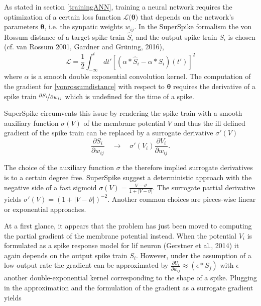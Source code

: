 As stated in section \ref{trainingANN}, training a neural network requires the optimization of a certain loss function $\mathcal{L(\mathbf{\theta)}}$ that depends on the network's parameters $\mathbf{\theta}$, i.e. the synpatic weights $w_{ij}$. In the SuperSpike formalism the von Rossum distance of a target spike train $\hat{S}_i$ and the output spike train $S_i$ is chosen (cf. van Rossum 2001, Gardner and Grüning, 2016),
\begin{equation}
\label{vonrossumdistance}
\mathcal{L} = \frac{1}{2} \int^t_{-\infty}dt' \left[\left(\alpha \ast \hat{S}_i - \alpha \ast S_i \right)(t')\right]^2
\end{equation}
where $\alpha$ is a smooth double exponential convolution kernel. The computation of the gradient for \ref{vonrossumdistance} with respect to $\mathbf{\theta}$ requires the derivative of a spike train $\nicefrac{\partial{S_i}}{\partial{w_{ij}}}$ which is undefined for the time of a spike. 

SuperSpike circumvents this issue by rendering the spike train with a smooth auxiliary function $\sigma(V)$ of the membrane potential $V$ and thus the ill defined gradient of the spike train can be replaced by a surrogate derivative $\sigma'(V)$
\begin{equation}
\frac{\partial S_i}{\partial w_{ij}} \quad \rightarrow \quad \sigma'(V_i)\frac{\partial V_i}{\partial w_{ij}}.
\end{equation}

The choice of the auxiliary function $\sigma$ the therefore implied surrogate derivatives is to a certain degree free. SuperSpike suggest a deterministic approach with the negative side of a fast sigmoid $\sigma(V) = \frac{V - \vartheta}{1 + |V - \vartheta|}$. The surrogate partial derivative yields $\sigma'(V) = \left(1 + |V - \vartheta|\right)^{-2}$. Another common choices are pieces-wise linear or exponential approaches.

At a first glance, it appears that the problem has just been moved to computing the partial gradient of the membrane potential instead. When the potential $V_i$ is formulated as a spike response model for \gls{lif} neuron (Gerstner et al., 2014) it again depends on the output spike train $S_i$. However, under the assumption of a low output rate the gradient can be approximated by $\frac{\partial U_i}{\partial w_{ij}} \approx (\epsilon \ast S_j)$ with $\epsilon$ another double-exponential kernel corresponding to the shape of a spike. Plugging in the approximation and the formulation of the gradient as a surrogate gradient yields

